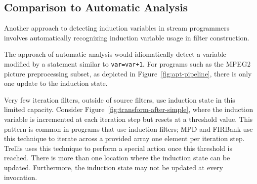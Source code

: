 \subsection{Comparison to Automatic Analysis}

Another approach to detecting induction variables in 
stream programmers involves automatically
recognizing induction variable usage in filter construction. 

The approach of automatic analysis would idiomatically detect 
a variable modified by a statement similar to \texttt{var=var+1}. For programs
such as the MPEG2 picture preprocessing subset, as depicted in Figure~\ref{fig:apt-pipeline},
there is only one update to the induction state.

Very few iteration filters, outside of source filters, use induction state 
in this limited capacity. Consider Figure~\ref{fig:transform-after-simple}, where
the induction variable is incremented at each iteration step but resets at 
a threshold value. This pattern is common in programs that use
induction filters; MPD and FIRBank use this technique to iterate
across a provided array one element per iteration step.  Trellis uses this
technique to perform a special action once this threshold is reached.
There is more than one location where the induction state can be updated.
Furthermore, the induction state may not be updated at every invocation.







